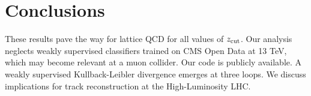 \section{Conclusions}\label{sec:conclusions}

These results pave the way for lattice QCD for all values of $z_{\rm
cut}$. Our analysis neglects weakly supervised classifiers trained on
CMS Open Data at 13 TeV, which may become relevant at a muon collider.
Our code is publicly available. A weakly supervised Kullback-Leibler
divergence emerges at three loops. We discuss implications for track
reconstruction at the High-Luminosity LHC.

